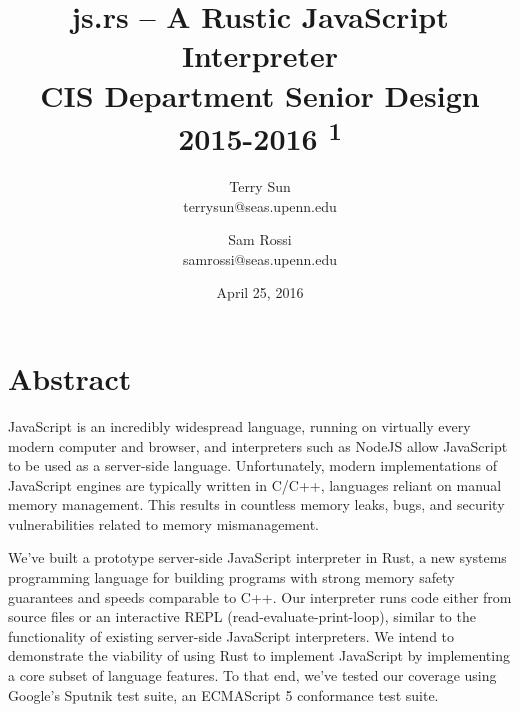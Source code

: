\documentclass{article}
\title{js.rs -- A Rustic JavaScript Interpreter \\
  {\large CIS Department Senior Design 2015-2016 \textsuperscript{1}}
}
\date{April 25, 2016}
\author{
  Terry Sun\\ terrysun@seas.upenn.edu \and
  Sam Rossi\\ samrossi@seas.upenn.edu
}
\begin{document}
\maketitle

\section*{Abstract}


JavaScript is an incredibly widespread language, running on virtually every
modern computer and browser, and interpreters such as NodeJS allow JavaScript to
be used as a server-side language. Unfortunately, modern implementations of
JavaScript engines are typically written in C/C++, languages reliant on manual
memory management. This results in countless memory leaks, bugs, and security
vulnerabilities related to memory mismanagement. \newline

We've built a prototype server-side JavaScript interpreter in Rust, a
new systems programming language for building programs with strong memory safety
guarantees and speeds comparable to C++. Our interpreter runs code either from
source files or an interactive REPL (read-evaluate-print-loop), similar to the
functionality of existing server-side JavaScript interpreters. We intend to
demonstrate the viability of using Rust to implement JavaScript by implementing
a core subset of language features. To that end, we’ve tested our coverage using
Google’s Sputnik test suite, an ECMAScript 5 conformance test suite.
\end{document}
